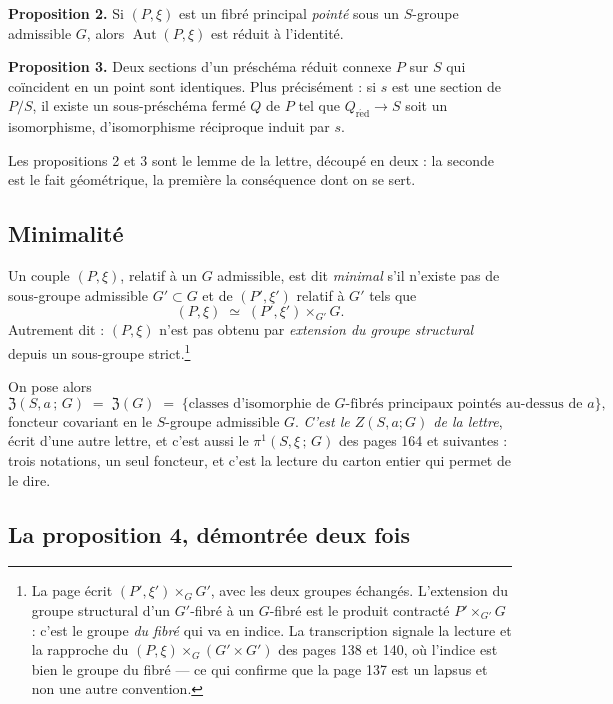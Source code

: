 \documentclass[11pt,a4paper]{article}
\begin{document}
\textbf{Proposition 2.} Si $(P, \xi)$ est un fibré principal \emph{pointé} sous
un $S$-groupe admissible $G$, alors $\operatorname{Aut}(P, \xi)$ est réduit à
l'identité.

\textbf{Proposition 3.} Deux sections d'un préschéma réduit connexe $P$ sur $S$
qui coïncident en un point sont identiques. Plus précisément : si $s$ est une
section de $P/S$, il existe un sous-préschéma fermé $Q$ de $P$ tel que
$Q_{\mathrm{r\acute{e}d}} \to S$ soit un isomorphisme, d'isomorphisme
réciproque induit par $s$.

Les propositions 2 et 3 sont le lemme de la lettre, découpé en deux : la
seconde est le fait géométrique, la première la conséquence dont on se sert.

\subsection*{Minimalité}

Un couple $(P, \xi)$, relatif à un $G$ admissible, est dit \emph{minimal} s'il
n'existe pas de sous-groupe admissible $G' \subset G$ et de $(P', \xi')$
relatif à $G'$ tels que
\[
  (P, \xi) \;\simeq\; (P', \xi') \times_{G'} G .
\]
Autrement dit : $(P,\xi)$ n'est pas obtenu par \emph{extension du groupe
structural} depuis un sous-groupe strict.\footnote{La page écrit
$(P',\xi') \times_{G} G'$, avec les deux groupes échangés. L'extension du
groupe structural d'un $G'$-fibré à un $G$-fibré est le produit contracté
$P' \times_{G'} G$ : c'est le groupe \emph{du fibré} qui va en indice. La
transcription signale la lecture et la rapproche du $(P,\xi) \times_{G}
(G' \times G')$ des pages 138 et 140, où l'indice est bien le groupe du fibré
--- ce qui confirme que la page 137 est un lapsus et non une autre convention.}

On pose alors
\[
  \mathfrak{Z}(S, a\,;\, G) \;=\; \mathfrak{Z}(G) \;=\;
  \bigl\{\text{classes d'isomorphie de $G$-fibrés principaux pointés au-dessus
  de } a\bigr\} ,
\]
foncteur covariant en le $S$-groupe admissible $G$. \emph{C'est le $Z(S,a;G)$
de la lettre}, écrit d'une autre lettre, et c'est aussi le
$\pi^{1}(S,\xi\,;\,G)$ des pages 164 et suivantes : trois notations, un seul
foncteur, et c'est la lecture du carton entier qui permet de le dire.

\subsection*{La proposition 4, démontrée deux fois}
\end{document}
